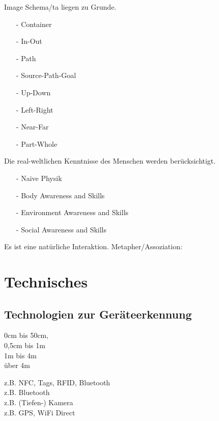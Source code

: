 \checkbox{\imageschemata} Image Schema/ta liegen zu Grunde.
\begin{itemize}
\item[-] \checkbox{\imageSchemaContainer} Container
\item[-] \checkbox{\imageSchemaInOut} In-Out
\item[-] \checkbox{\imageSchemaPath} Path
\item[-] \checkbox{\imageSchemaSourcePathGoal} Source-Path-Goal
\item[-] \checkbox{\imageSchemaUpDown} Up-Down
\item[-] \checkbox{\imageSchemaLeftRight} Left-Right
\item[-] \checkbox{\imageSchemaNearFar} Near-Far
\item[-] \checkbox{\imageSchemaPartWhole} Part-Whole
\end{itemize}

\checkbox{\realworld} Die real-weltlichen Kenntnisse des Menschen werden berücksichtigt.
\begin{itemize}
\item[-] \checkbox{\realworldNaivePhysic} Naive Physik
\item[-] \checkbox{\realworldBodyAwareness} Body Awareness and Skills
\item[-] \checkbox{\realworldEnvironmentAwareness} Environment Awareness and Skills
\item[-] \checkbox{\realworldSocialAwareness} Social Awareness and Skills
\end{itemize}

\checkbox{\metaphor} Es ist eine natürliche Interaktion. Metapher/Assoziation: \metaphordesc


\section*{Technisches}

\subsection*{Technologien zur Geräteerkennung}


\begin{minipage}{0.3\textwidth}
\checkbox{\technologyObjectIntimate} 0cm bis 50cm, \\
\checkbox{\technologyObjectPersonal} 0,5cm bis 1m \\
\checkbox{\technologyObjectSocial} 1m bis 4m \\
\checkbox{\technologyObjectPublic} über 4m 
\end{minipage}
\begin{minipage}{0.5\textwidth}
z.B. NFC, Tags, RFID, Bluetooth \\
z.B. Bluetooth \\
z.B. (Tiefen-) Kamera \\
z.B. GPS, WiFi Direct
\end{minipage}\\

